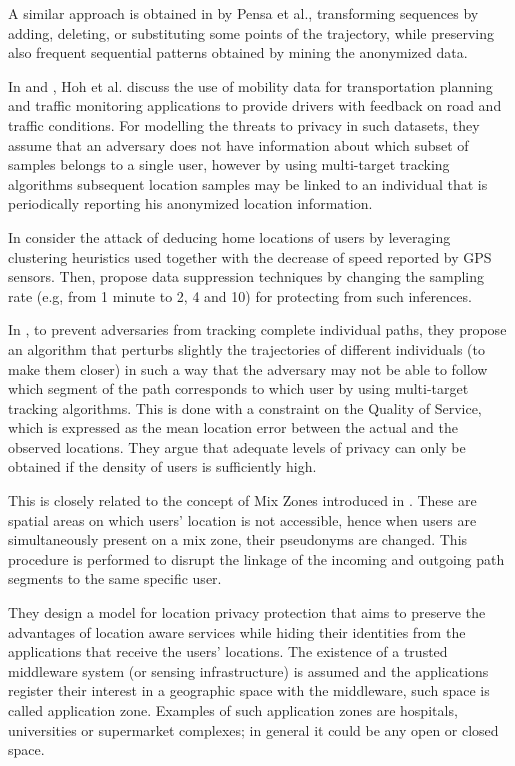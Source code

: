 \documentclass[review]{elsarticle}
\begin{document}
A similar approach is obtained in \cite{Pensa2008} by Pensa et al., transforming sequences by adding, deleting, or substituting some points of the trajectory, while preserving also frequent sequential patterns \cite{Agrawal:1995} obtained by mining the anonymized data.


In \cite{Hoh2005} and \cite{Hoh06}, Hoh et al. discuss the use of mobility data for transportation planning and traffic monitoring applications to provide drivers with feedback on road and traffic conditions.
For modelling the threats to privacy in such datasets, they assume that an adversary does not have information about which subset of samples belongs to a single user, however by using multi-target tracking algorithms \cite{Reid79analgorithm} subsequent location samples may be linked to an individual that is periodically reporting his anonymized location information.

In \cite{Hoh06} consider the attack of deducing home locations of users by leveraging clustering heuristics used together with the decrease of speed reported by GPS sensors. Then, propose data suppression techniques by changing the sampling rate (e.g, from 1 minute to 2, 4 and 10) for protecting from such inferences.

In \cite{Hoh2005}, to prevent adversaries from tracking complete individual paths, they propose an algorithm that perturbs slightly the trajectories of different individuals (to make them closer) in such a way that the adversary may not be able to follow which segment of the path corresponds to which user by using multi-target tracking algorithms.
This is done with a constraint on the Quality of Service, which is expressed as the mean location error between the actual and the observed locations. They argue that adequate levels of privacy can only be obtained if the density of users is sufficiently high.


This is closely related to the concept of Mix Zones introduced in \cite{Beresford2003}. These are spatial areas on which users' location is not accessible, hence when users are simultaneously present on a mix zone, their pseudonyms are changed. This procedure is performed to disrupt the linkage of the incoming and outgoing path segments to the same specific user.

They design a model for location privacy protection that aims to preserve the advantages of location aware services while hiding their identities from the applications that receive the users' locations.
The existence of a trusted middleware system (or sensing infrastructure) is assumed and the applications register their interest in a geographic space with the middleware, such space is called application zone. Examples of such application zones are hospitals, universities or supermarket complexes; in general it could be any open or closed space.
\end{document}
